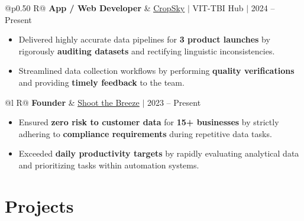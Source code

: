 \documentclass[a4paper,10pt]{article}
\newcommand{\ulink}[2]{\href{#1}{\uline{#2}}}
\newcommand{\subheading}[1]{{\color[HTML]{0A0A0A}\fontsize{12}{14}\selectfont\bfseries #1}}
\newcommand{\meta}[1]{{\color[HTML]{5C5C5C}\fontsize{10.5}{12.5}\selectfont #1}}
\begin{document}
\begin{tabularx}{\linewidth}{@{}p{0.50\linewidth} R@{}}
\subheading{App / Web Developer} & \meta{\ulink{https://sites.google.com/view/cropsky/home}{CropSky} $|$ VIT-TBI Hub $|$ 2024 -- Present}
\end{tabularx}
\begin{itemize}[nosep, leftmargin=1.5em, itemsep=1pt, topsep=2pt]
  \item {\color[HTML]{0A0A0A}\fontsize{11}{14}\selectfont Delivered highly accurate data pipelines for \textbf{3 product launches} by rigorously \textbf{auditing datasets} and rectifying linguistic inconsistencies.}
  \item {\color[HTML]{0A0A0A}\fontsize{11}{14}\selectfont Streamlined data collection workflows by performing \textbf{quality verifications} and providing \textbf{timely feedback} to the team.}
\end{itemize}

\vspace{2pt}

\begin{tabularx}{\linewidth}{@{}l R@{}}
\subheading{Founder} & \meta{\ulink{https://shoot-the-breeze.vercel.app}{Shoot the Breeze} $|$ 2023 -- Present}
\end{tabularx}
\begin{itemize}[nosep, leftmargin=1.5em, itemsep=1pt, topsep=2pt]
  \item {\color[HTML]{0A0A0A}\fontsize{11}{14}\selectfont Ensured \textbf{zero risk to customer data} for \textbf{15+ businesses} by strictly adhering to \textbf{compliance requirements} during repetitive data tasks.}
  \item {\color[HTML]{0A0A0A}\fontsize{11}{14}\selectfont Exceeded \textbf{daily productivity targets} by rapidly evaluating analytical data and prioritizing tasks within automation systems.}
\end{itemize}

\vspace{2pt}

\section{Projects}
\vspace{2pt}
\end{document}
